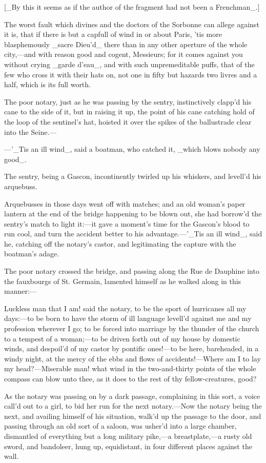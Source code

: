 \documentclass[twoside]{article}
\begin{document}
    [_By this it seems as if the author of the fragment had not been a
                               Frenchman_.]

The worst fault which divines and the doctors of the Sorbonne can allege
against it is, that if there is but a capfull of wind in or about Paris,
’tis more blasphemously _sacre Dieu’d_ there than in any other aperture
of the whole city,—and with reason good and cogent, Messieurs; for it
comes against you without crying _garde d’eau_, and with such
unpremeditable puffs, that of the few who cross it with their hats on,
not one in fifty but hazards two livres and a half, which is its full
worth.

The poor notary, just as he was passing by the sentry, instinctively
clapp’d his cane to the side of it, but in raising it up, the point of
his cane catching hold of the loop of the sentinel’s hat, hoisted it over
the spikes of the ballustrade clear into the Seine.—

—’_Tis an ill wind_, said a boatman, who catched it, _which blows nobody
any good_.

The sentry, being a Gascon, incontinently twirled up his whiskers, and
levell’d his arquebuss.

Arquebusses in those days went off with matches; and an old woman’s paper
lantern at the end of the bridge happening to be blown out, she had
borrow’d the sentry’s match to light it:—it gave a moment’s time for the
Gascon’s blood to run cool, and turn the accident better to his
advantage.—’_Tis an ill wind_, said he, catching off the notary’s castor,
and legitimating the capture with the boatman’s adage.

The poor notary crossed the bridge, and passing along the Rue de Dauphine
into the fauxbourgs of St. Germain, lamented himself as he walked along
in this manner:—

Luckless man that I am! said the notary, to be the sport of hurricanes
all my days:—to be born to have the storm of ill language levell’d
against me and my profession wherever I go; to be forced into marriage by
the thunder of the church to a tempest of a woman;—to be driven forth out
of my house by domestic winds, and despoil’d of my castor by pontific
ones!—to be here, bareheaded, in a windy night, at the mercy of the ebbs
and flows of accidents!—Where am I to lay my head?—Miserable man! what
wind in the two-and-thirty points of the whole compass can blow unto
thee, as it does to the rest of thy fellow-creatures, good?

As the notary was passing on by a dark passage, complaining in this sort,
a voice call’d out to a girl, to bid her run for the next notary.—Now the
notary being the next, and availing himself of his situation, walk’d up
the passage to the door, and passing through an old sort of a saloon, was
usher’d into a large chamber, dismantled of everything but a long
military pike,—a breastplate,—a rusty old sword, and bandoleer, hung up,
equidistant, in four different places against the wall.
\end{document}
